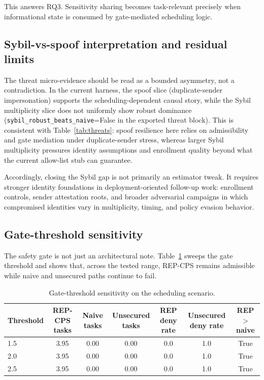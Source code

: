 \documentclass[11pt]{article}
\newcommand{\repcps}{REP-CPS}
\newcommand{\field}[1]{\texttt{#1}}
\begin{document}
This answers RQ3. Sensitivity sharing becomes task-relevant precisely when informational state is consumed by gate-mediated scheduling logic.

\subsection{Sybil-vs-spoof interpretation and residual limits}

The threat micro-evidence should be read as a bounded asymmetry, not a contradiction. In the current harness, the spoof slice (duplicate-sender impersonation) supports the scheduling-dependent causal story, while the Sybil multiplicity slice does not uniformly show robust dominance (\field{sybil\_robust\_beats\_naive}=False in the exported threat block). This is consistent with Table~\ref{tab:threats}: spoof resilience here relies on admissibility and gate mediation under duplicate-sender stress, whereas larger Sybil multiplicity pressures identity assumptions and enrollment quality beyond what the current allow-list stub can guarantee.

Accordingly, closing the Sybil gap is not primarily an estimator tweak. It requires stronger identity foundations in deployment-oriented follow-up work: enrollment controls, sender attestation roots, and broader adversarial campaigns in which compromised identities vary in multiplicity, timing, and policy evasion behavior.

\subsection{Gate-threshold sensitivity}

The safety gate is not just an architectural note. Table~\ref{tab:gate} sweeps the gate threshold and shows that, across the tested range, \repcps{} remains admissible while naive and unsecured paths continue to fail.

\begin{table}[H]
\centering
\caption{Gate-threshold sensitivity on the scheduling scenario.}
\label{tab:gate}
\begin{tabular}{lcccccc}
\toprule
Threshold & REP-CPS tasks & Naive tasks & Unsecured tasks & REP deny rate & Unsecured deny rate & REP $>$ naive \\
\midrule
1.5 & 3.95 & 0.00 & 0.00 & 0.0 & 1.0 & True \\
2.0 & 3.95 & 0.00 & 0.00 & 0.0 & 1.0 & True \\
2.5 & 3.95 & 0.00 & 0.00 & 0.0 & 1.0 & True \\
\bottomrule
\end{tabular}
\end{table}
\end{document}

